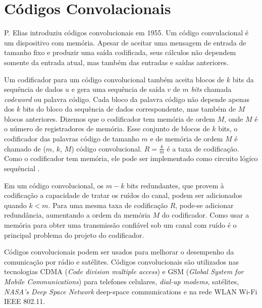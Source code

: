 \section{Códigos Convolacionais}

P. Elias introduziu códigos convolucionais em 1955. Um código convulacional é um dispositivo com memória. Apesar de aceitar uma mensagem de entrada de tamanho fixo e produzir uma saída codificada, seus cálculos não dependem somente da entrada atual, mas também das entradas e saídas anteriores.

Um codificador para um código convolucional também aceita blocos de $k$ bits da sequência de dados $u$ e gera uma sequência de saída $v$ de $m$ \emph{bits} chamada \emph{codeword} ou palavra código. Cada bloco da palavra código não depende apenas dos $k$ bits do bloco da sequência de dados correspondente, mas também de $M$ blocos anteriores. Dizemos que o codificador tem memória de ordem $M$, onde $M$ é o número de registradores de memória. Esse conjunto de blocos de $k$ bits, o codificador das palavras código de tamanho $m$ e de memória de ordem $M$ é chamado de ($m$, $k$, $M$) código convolucional. $R = \frac{k}{m}$  é a taxa de codificação. Como o codificador tem memória, ele pode ser implementado como circuito lógico sequêncial \cite{Lin:1983}.

Em um código convolucional, os $m - k$ bits redundantes, que provem à codificação a capacidade de tratar os ruídos do canal, podem ser adicionados quando $k < m$. Para uma mesma taxa de codificação $R$, pode-se adicionar redundância, aumentando a ordem da memória $M$ do codificador. Como usar a memória para obter uma transmissão confiável sob um canal com ruído é o principal problema do projeto do codificador.

Códigos convolucionais podem ser usados para melhorar o desempenho da comunicação por rádio e satélites. Códigos convolucionais são utilizados nas tecnologias CDMA (\emph{Code division multiple access}) e GSM (\emph{Global System for Mobile Communications}) para telefones celulares, \emph{dial-up modems}, satélites, \emph{NASA's Deep Space Network} deep-space communications e na rede WLAN Wi-Fi IEEE 802.11.


